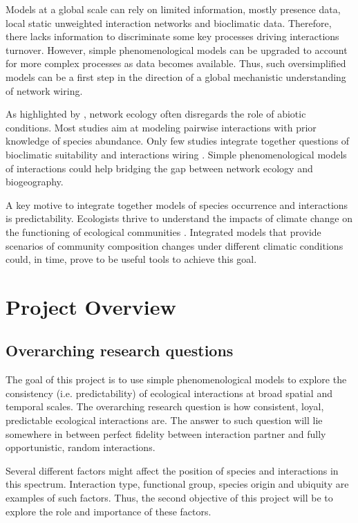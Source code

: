 \documentclass[12pt]{article}
\begin{document}
Models at a global scale can rely on limited information, mostly presence data, local static unweighted interaction networks and bioclimatic data.
Therefore, there lacks information to discriminate some key processes driving interactions turnover.
However, simple phenomenological models can be upgraded to account for more complex processes as data becomes available.
Thus, such oversimplified models can be a first step in the direction of a global mechanistic understanding of network wiring.

As highlighted by \citet{Fortuna2020}, network ecology often disregards the role of abiotic conditions.
Most studies aim at modeling pairwise interactions with prior knowledge of species abundance.
Only few studies integrate together questions of bioclimatic suitability and interactions wiring \citep{Graham2018,Gravel2019}.
Simple phenomenological models of interactions could help bridging the gap between network ecology and biogeography.

A key motive to integrate together models of species occurrence and interactions is predictability.
Ecologists thrive to understand the impacts of climate change on the functioning of ecological communities \citep{Parmesan2003}.
Integrated models that provide scenarios of community composition changes under different climatic conditions could, in time, prove to be useful tools to achieve this goal.

\section{Project Overview}
\subsection{Overarching research questions}
The goal of this project is to use simple phenomenological models to explore the consistency (i.e. predictability) of ecological interactions at broad spatial and temporal scales.
The overarching research question is how consistent, loyal, predictable ecological interactions are.
The answer to such question will lie somewhere in between perfect fidelity between interaction partner and fully opportunistic, random interactions.

Several different factors might affect the position of species and interactions in this spectrum.
Interaction type, functional group, species origin and ubiquity are examples of such factors.
Thus, the second objective of this project will be to explore the role and importance of these factors.
\end{document}
